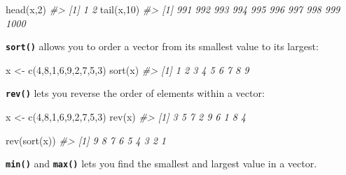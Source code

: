 \documentclass[
]{book}
\newenvironment{Shaded}{\begin{snugshade}}{\end{snugshade}}
\newcommand{\CommentTok}[1]{\textcolor[rgb]{0.56,0.35,0.01}{\textit{#1}}}
\newcommand{\DecValTok}[1]{\textcolor[rgb]{0.00,0.00,0.81}{#1}}
\newcommand{\FunctionTok}[1]{\textcolor[rgb]{0.00,0.00,0.00}{#1}}
\newcommand{\NormalTok}[1]{#1}
\newcommand{\OtherTok}[1]{\textcolor[rgb]{0.56,0.35,0.01}{#1}}
\begin{document}
\begin{Shaded}
\begin{Highlighting}[]
\FunctionTok{head}\NormalTok{(x,}\DecValTok{2}\NormalTok{)}
\CommentTok{\#\textgreater{} [1] 1 2}
\FunctionTok{tail}\NormalTok{(x,}\DecValTok{10}\NormalTok{)}
\CommentTok{\#\textgreater{}  [1]  991  992  993  994  995  996  997  998  999 1000}
\end{Highlighting}
\end{Shaded}

\textbf{\texttt{sort()}} allows you to order a vector from its smallest value to its largest:

\begin{Shaded}
\begin{Highlighting}[]
\NormalTok{x }\OtherTok{\textless{}{-}} \FunctionTok{c}\NormalTok{(}\DecValTok{4}\NormalTok{,}\DecValTok{8}\NormalTok{,}\DecValTok{1}\NormalTok{,}\DecValTok{6}\NormalTok{,}\DecValTok{9}\NormalTok{,}\DecValTok{2}\NormalTok{,}\DecValTok{7}\NormalTok{,}\DecValTok{5}\NormalTok{,}\DecValTok{3}\NormalTok{)}
\FunctionTok{sort}\NormalTok{(x)}
\CommentTok{\#\textgreater{} [1] 1 2 3 4 5 6 7 8 9}
\end{Highlighting}
\end{Shaded}

\textbf{\texttt{rev()}} lets you reverse the order of elements within a vector:

\begin{Shaded}
\begin{Highlighting}[]
\NormalTok{x }\OtherTok{\textless{}{-}} \FunctionTok{c}\NormalTok{(}\DecValTok{4}\NormalTok{,}\DecValTok{8}\NormalTok{,}\DecValTok{1}\NormalTok{,}\DecValTok{6}\NormalTok{,}\DecValTok{9}\NormalTok{,}\DecValTok{2}\NormalTok{,}\DecValTok{7}\NormalTok{,}\DecValTok{5}\NormalTok{,}\DecValTok{3}\NormalTok{)}
\FunctionTok{rev}\NormalTok{(x)}
\CommentTok{\#\textgreater{} [1] 3 5 7 2 9 6 1 8 4}
\end{Highlighting}
\end{Shaded}

\begin{Shaded}
\begin{Highlighting}[]
\FunctionTok{rev}\NormalTok{(}\FunctionTok{sort}\NormalTok{(x))}
\CommentTok{\#\textgreater{} [1] 9 8 7 6 5 4 3 2 1}
\end{Highlighting}
\end{Shaded}

\textbf{\texttt{min()}} and \textbf{\texttt{max()}} lets you find the smallest and largest value in a vector.
\end{document}
